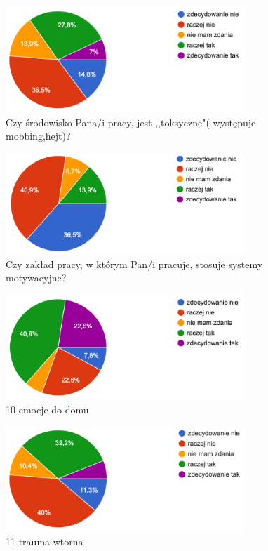 \begin{figure}
    \includegraphics[width=9cm]{wyniki/08_srod_toksyczne}
    \caption{Czy środowisko Pana/i pracy, jest ,,toksyczne"( występuje mobbing,hejt)?}
    \label{rys:toksyczne}
\end{figure}

\begin{figure}
    \includegraphics[width=9cm]{wyniki/09_systemy_motyw}
    \caption{Czy zakład pracy, w którym Pan/i pracuje, stosuje systemy motywacyjne?}
    \label{rys:syst_motyw}
\end{figure}

\begin{figure}
    \includegraphics[width=9cm]{wyniki/10_emocje_do_domu}
    \caption{ 10 emocje do domu }
\end{figure}

\begin{figure}
    \includegraphics[width=9cm]{wyniki/11_trauma_wtorna}
    \caption{ 11 trauma wtorna }
\end{figure}

